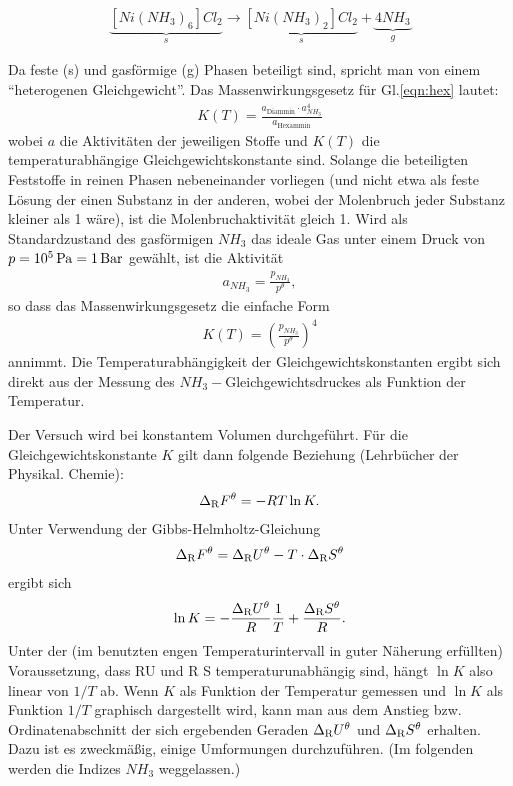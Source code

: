 \documentclass[ngerman,twocolumn,DIV21,a4,10pt]{scrartcl}
\begin{document}
\begin{align}
\label{eqn:hex}
\underbrace{[Ni(NH_3)_6]Cl_2}_s \rightarrow 
\underbrace{[Ni(NH_3)_2]Cl_2}_s + \underbrace{4 NH_3}_g
\end{align}

Da feste (s) und gasförmige (g) Phasen beteiligt sind, spricht man von
einem ``heterogenen Gleichgewicht''.  Das Massenwirkungsgesetz für
Gl.\eqref{eqn:hex} lautet:
\begin{align}
K(T) = \frac{a_\textrm{Diammin} \cdot a^4_{NH_3}}{a_\textrm{Hexammin}}
\end{align}
wobei $a$ die  Aktivit\"aten der
jeweiligen Stoffe und $K(T)$ die temperaturabhängige
Gleichgewichtskonstante sind. Solange die beteiligten Feststoffe in
reinen Phasen nebeneinander vorliegen (und nicht etwa als feste
L\"osung der einen Substanz in der anderen, wobei der Molenbruch jeder
Substanz kleiner als 1 w\"are), ist die Molenbruchaktivit\"at gleich
1.  Wird als Standardzustand des gasförmigen $NH_3$ das ideale Gas
unter einem Druck von $p = \unit[10^5]{Pa} = \unit[1]{Bar}$ gewählt,
ist die Aktivit\"at
\begin{align}
a_{NH_3}=\frac{p_{NH_3}}{p^\theta},
\end{align}
so dass das Massenwirkungsgesetz die einfache Form
\begin{align}
K(T)=\left(\frac{p_{NH_3}}{p^\theta}\right)^4
\end{align}
annimmt. Die Temperaturabhängigkeit der Gleichgewichtskonstanten
ergibt sich direkt aus der Messung des $NH_3-$Gleichgewichtsdruckes
als Funktion der Temperatur.

Der Versuch wird bei konstantem Volumen durchgeführt. Für die
Gleichgewichtskonstante $K$ gilt dann folgende Beziehung (Lehrbücher
der Physikal. Chemie):
\begin{align}
\label{eqn:frei}
\Delta_\textrm{R} F^\theta = -RT\ln K.
\end{align}
Unter Verwendung der Gibbs-Helmholtz-Gleichung
\begin{align}
\label{eqn:frei2}
\Delta_\textrm{R} F^\theta = \Delta_\textrm{R} U^\theta - T \cdot \Delta_\textrm{R} S^\theta
\end{align}
ergibt sich
\begin{align}
\ln K = -\frac{\Delta_\textrm{R} U^\theta}{R}\frac{1}{T} + \frac{\Delta_\textrm{R} S^\theta}{R}.
\end{align}
Unter der (im benutzten engen Temperaturintervall in guter Näherung
erfüllten) Voraussetzung, dass RU und R S temperaturunabhängig sind,
hängt $\ln K$ also linear von $1/T$ ab. Wenn $K$ als Funktion der
Temperatur gemessen und $\ln K$ als Funktion $1/T$ graphisch
dargestellt wird, kann man aus dem Anstieg bzw. Ordinatenabschnitt der
sich ergebenden Geraden $\Delta_\textrm{R} U^\theta$ und $\Delta_\textrm{R} S^\theta$
erhalten. Dazu ist es zweckmäßig, einige Umformungen
durchzuführen. (Im folgenden werden die Indizes $NH_3$ weggelassen.)
\end{document}
